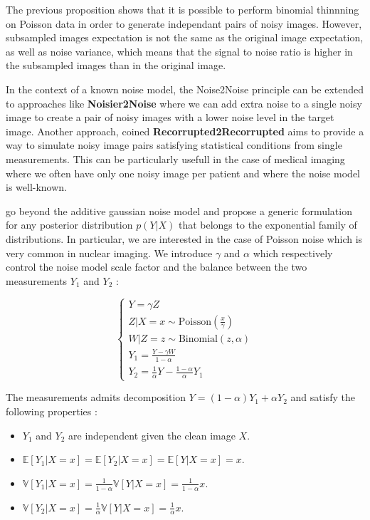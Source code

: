 The previous proposition shows that it is possible to perform binomial thinnning on Poisson data in order to generate independant pairs of noisy images.
However, subsampled images expectation is not the same as the original image expectation, as well as noise variance, which means that the signal to noise ratio is higher in the subsampled images than in the original image.

In the context of a known noise model, the Noise2Noise principle can be extended to approaches like \textbf{Noisier2Noise} \cite{moran_noisier2noise_2019} where we can add extra noise to a single noisy image to create a pair of noisy images with a lower noise level in the target image.
Another approach, coined \textbf{Recorrupted2Recorrupted} aims to provide a way to simulate noisy image pairs satisfying statistical conditions from single measurements.
This can be particularly usefull in the case of medical imaging where we often have only one noisy image per patient and where the noise model is well-known.

\cite{gr2r} go beyond the additive gaussian noise model and propose a generic formulation for any posterior distribution $p(Y|X)$ that belongs to the exponential family of distributions.
In particular, we are interested in the case of Poisson noise which is very common in nuclear imaging.
We introduce $\gamma$ and $\alpha$ which respectively control the noise model scale factor and the balance between the two measurements $Y_1$ and $Y_2$ :


\begin{equation*}
    \begin{cases}
        Y = \gamma Z \\
        Z | X =x \sim \text{Poisson}(\frac{x}{\gamma}) \\
        W | Z = z \sim \text{Binomial}(z, \alpha) \\
        Y_1 = \frac{Y - \gamma W}{1 - \alpha} \\
        Y_2 = \frac{1}{\alpha} Y - \frac{1 - \alpha}{\alpha} Y_1
    \end{cases}
\end{equation*}

\begin{proposition}
    The measurements admits decomposition $Y = (1 - \alpha) Y_1 + \alpha Y_2$ and satisfy the following properties :
    \begin{itemize}
        \item $Y_1$ and $Y_2$ are independent given the clean image $X$.
        \item $\mathbb{E}[Y_1 | X=x] = \mathbb{E}[Y_2 | X=x] = \mathbb{E}[Y | X=x] = x$.
        \item $\mathbb{V}[Y_1 | X=x] = \frac{1}{1 - \alpha} \mathbb{V}[Y | X=x] = \frac{1}{1 - \alpha} x$.
        \item $\mathbb{V}[Y_2 | X=x] = \frac{1}{\alpha} \mathbb{V}[Y | X=x] = \frac{1}{\alpha} x$.
    \end{itemize}
\end{proposition}

